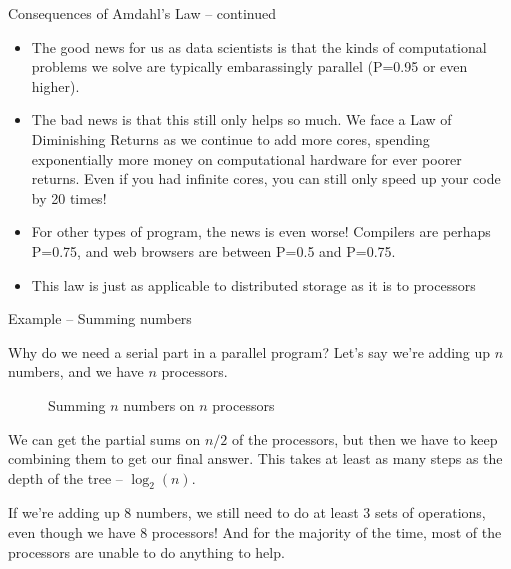 \documentclass{beamer}
\begin{document}
\begin{frame}{Consequences of Amdahl's Law -- continued}
	\begin{itemize}
		\item The good news for us as data scientists is that the kinds of computational
	problems we solve are typically embarassingly parallel (P=0.95 or even higher). \\
		\item The bad news is that this still only helps so much. We face a Law of Diminishing
		Returns as we continue to add more cores, spending exponentially more money
		on computational hardware for ever poorer returns. Even if you had infinite
		cores, you can still only speed up your code by 20 times! \\
		\item For other types of program, the news is even worse! Compilers are perhaps
		P=0.75, and web browsers are between P=0.5 and P=0.75.
		\item This law is just as applicable to distributed storage
		as it is to processors
	\end{itemize}
\end{frame}

\begin{frame}{Example -- Summing numbers}

	{\small
	Why do we need a serial part in a parallel program? Let's say we're adding up $n$ numbers, and we have $n$ processors.
	}
	\begin{figure}
		\scalebox{0.25}{}
		\caption{Summing $n$ numbers on $n$ processors}
	\end{figure}
	{\small
	We can get the partial sums on $n/2$ of the processors, but then we have to
	keep combining them to get our final answer. This takes at least as many steps
	as the depth of the tree -- $\log_2{(n)}$. 

	If we're adding up $8$ numbers, we still need to do at least $3$ sets of operations,
	even though we have $8$ processors! And for the majority of the time, most of the
	processors are unable to do anything to help.
	}
\end{frame}
\end{document}
